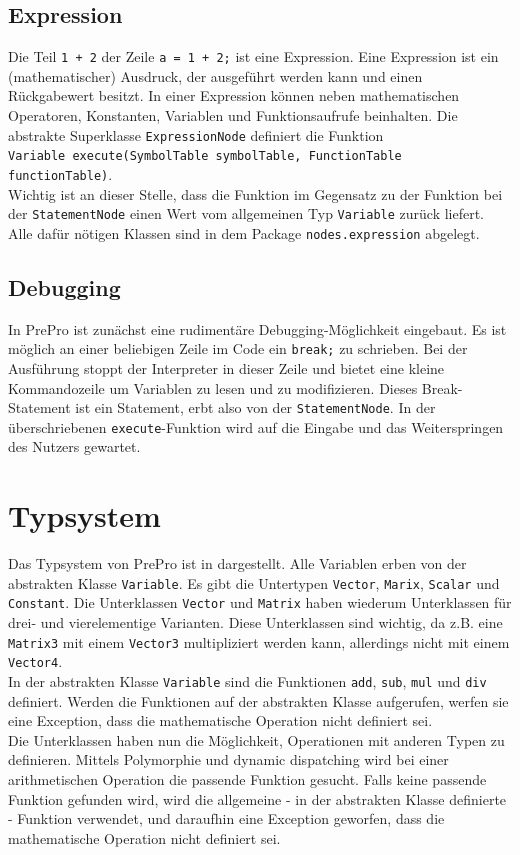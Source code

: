 \subsection{Expression}
Die Teil \texttt{1 + 2} der Zeile \texttt{a = 1 + 2;} ist eine Expression.
Eine Expression ist ein (mathematischer) Ausdruck, der ausgeführt werden kann und einen Rückgabewert besitzt.
In einer Expression können neben mathematischen Operatoren, Konstanten, Variablen und Funktionsaufrufe beinhalten.
Die abstrakte Superklasse \texttt{ExpressionNode} definiert die Funktion\\
\texttt{Variable execute(SymbolTable symbolTable, FunctionTable functionTable)}.\\
Wichtig ist an dieser Stelle, dass die Funktion im Gegensatz zu der Funktion bei der \texttt{StatementNode} einen Wert vom allgemeinen Typ \texttt{Variable} zurück liefert.
Alle dafür nötigen Klassen sind in dem Package \texttt{nodes.expression} abgelegt.

\subsection{Debugging}
In PrePro ist zunächst eine rudimentäre Debugging-Möglichkeit eingebaut.
Es ist möglich an einer beliebigen Zeile im Code ein \texttt{break;} zu schrieben.
Bei der Ausführung stoppt der Interpreter in dieser Zeile und bietet eine kleine Kommandozeile um Variablen zu lesen und zu modifizieren.
Dieses Break-Statement ist ein Statement, erbt also von der \texttt{StatementNode}.
In der überschriebenen \texttt{execute}-Funktion wird auf die Eingabe und das Weiterspringen des Nutzers gewartet.

\section{Typsystem}
Das Typsystem von PrePro ist in  dargestellt.
Alle Variablen erben von der abstrakten Klasse \texttt{Variable}.
Es gibt die Untertypen \texttt{Vector}, \texttt{Marix}, \texttt{Scalar} und \texttt{Constant}.
Die Unterklassen \texttt{Vector} und \texttt{Matrix} haben wiederum Unterklassen für drei- und vierelementige Varianten.
Diese Unterklassen sind wichtig, da z.B. eine \texttt{Matrix3} mit einem \texttt{Vector3} multipliziert werden kann, allerdings nicht mit einem \texttt{Vector4}.\\
In der abstrakten Klasse \texttt{Variable} sind die Funktionen \texttt{add}, \texttt{sub}, \texttt{mul} und \texttt{div} definiert.
Werden die Funktionen auf der abstrakten Klasse aufgerufen, werfen sie eine Exception, dass die mathematische Operation nicht definiert sei.\\
Die Unterklassen haben nun die Möglichkeit, Operationen mit anderen Typen zu definieren.
Mittels Polymorphie und dynamic dispatching wird bei einer arithmetischen Operation die passende Funktion gesucht.
Falls keine passende Funktion gefunden wird, wird die allgemeine - in der abstrakten Klasse definierte - Funktion verwendet, und daraufhin eine Exception geworfen, dass die mathematische Operation nicht definiert sei.

